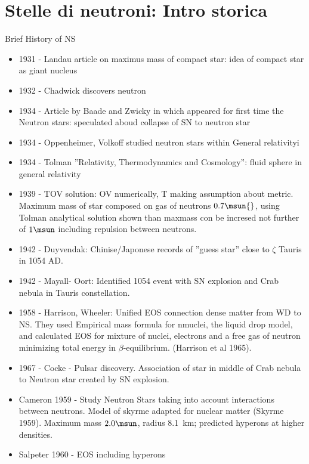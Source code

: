 \section{Stelle di neutroni: Intro storica}

\begin{frame}{Brief History of NS}
    \begin{itemize}
        \item 1931 - Landau article on maximus mass of compact star: idea of compact star as giant nucleus
        \item 1932 - Chadwick discovers neutron
        \item 1934 - Article by Baade and Zwicky in which appeared for first time the Neutron stars: speculated aboud collapse of SN to neutron star
        \item 1934 - Oppenheimer, Volkoff studied neutron stars within General relativityi
        \item 1934 - Tolman ''Relativity, Thermodynamics and Cosmology'': fluid sphere in general relativity
        \item 1939 - TOV solution: OV numerically, T making assumption about metric. Maximum mass of star composed on gas of neutrons $0.7\msun{}$, using Tolman analytical solution shown than maxmass con be incresed not further of $1\msun$ including repulsion between neutrons.
        \item 1942 - Duyvendak: Chinise/Japonese records of ''guess star'' close to $\zeta$ Tauris in 1054 AD.
        \item 1942 - Mayall- Oort: Identified 1054 event with SN explosion and Crab nebula in Tauris constellation.
        \item 1958 - Harrison, Wheeler: Unified EOS connection dense matter from WD to NS. They used Empirical mass formula for nmuclei, the liquid drop model, and calculated EOS for mixture of nuclei, electrons and a free gas of neutron minimizing total energy in $\beta$-equilibrium. (Harrison et al 1965).
        \item 1967 - Cocke - Pulsar discovery. Association of star in middle of Crab nebula to Neutron star created by SN explosion.
        \item Cameron 1959 - Study Neutron Stars taking into account interactions between neutrons. Model of skyrme adapted for nuclear matter (Skyrme 1959). Maximum mass $2.0\msun$, radius \SI{8.1}{\kilo\meter}; predicted hyperons at higher densities.
        \item Salpeter 1960 - EOS including hyperons

\end{itemize}
\end{frame}
